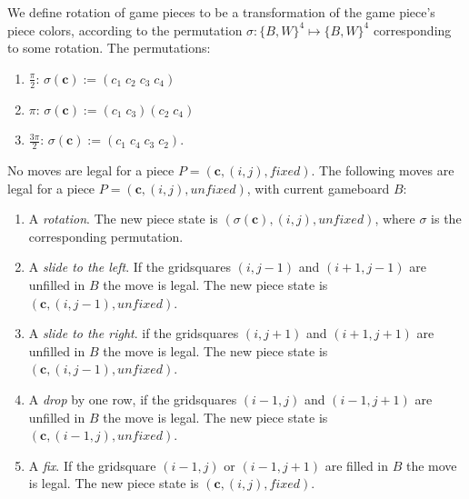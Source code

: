 \begin{description}[style=unboxed, leftmargin=0cm,labelsep=1em]
    \item[Rotating pieces] We define rotation of game pieces to be a transformation of the game piece's piece colors, according to the permutation $\sigma: \{B,W\}^4 \mapsto \{B,W\}^4$ corresponding to some rotation. The permutations:

    \begin{enumerate}
        \item $\frac{\pi}{2}$: $\sigma(\mathbf{c}) := (c_1\;c_2\;c_3\;c_4)$
        \item $\pi$: $\sigma(\mathbf{c}) := (c_1\;c_3)(c_2\;c_4)$
        \item $\frac{3 \pi}{2}$: $\sigma(\mathbf{c}) := (c_1\;c_4\;c_3\;c_2)$.
    \end{enumerate}

    \item[Playing the game] No moves are legal for a piece $P = (\mathbf{c}, (i,j), fixed)$. The following moves are legal for a piece $P = (\mathbf{c}, (i,j), unfixed)$, with current gameboard $B$:

    \begin{enumerate}
        \item A \emph{rotation}. The new piece state is $(\sigma(\mathbf{c}), (i,j), unfixed)$, where $\sigma$ is the corresponding permutation.
        \item A \emph{slide to the left}. If the gridsquares $(i,j-1)$ and $(i+1, j-1)$ are unfilled in $B$ the move is legal. The new piece state is $(\mathbf{c}, (i, j-1), unfixed)$.
        \item A \emph{slide to the right}. if the gridsquares $(i,j+1)$ and $(i+1, j+1)$ are unfilled in $B$ the move is legal. The new piece state is $(\mathbf{c}, (i, j-1), unfixed)$.
        \item A \emph{drop} by one row, if the gridsquares $(i-1, j)$ and $(i-1, j+1)$ are unfilled in $B$ the move is legal. The new piece state is $(\mathbf{c}, (i-1, j), unfixed)$.
        \item A \emph{fix}. If the gridsquare $(i-1, j)$ or $(i-1, j+1)$ are filled in $B$ the move is legal. The new piece state is $(\mathbf{c}, (i, j), fixed)$.
    \end{enumerate}
\end{description}
